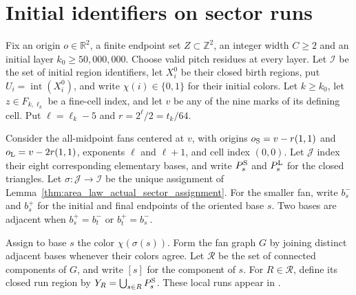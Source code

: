 \section{Initial identifiers on sector runs}
\label{sec:area_law_actual_sector_runs}

Fix an origin $o\in\mathbb R^2$, a finite endpoint set
$Z\subset\mathbb Z^2$, an integer width $C\ge2$ and an initial layer
$k_0\ge50{,}000{,}000$. Choose valid pitch residues at every
layer. Let $\mathcal I$ be the set of initial region identifiers, let $X_i^0$
be their closed birth regions, put $U_i=\operatorname{int}(X_i^0)$,
and write $\chi(i)\in\{0,1\}$ for their initial colors.
Let $k\ge k_0$, let $z\in F_{k,\ell_k}$ be a fine-cell index,
and let $v$ be any of the nine marks of its defining cell.
Put $\ell=\ell_k-5$ and $r=2^\ell/2=t_k/64$.

Consider the all-midpoint fans centered at $v$, with origins
$o_{\rm S}=v-r(1,1)$ and $o_{\rm L}=v-2r(1,1)$, exponents $\ell$
and $\ell+1$, and cell index $(0,0)$. Let $\mathcal J$ index their
eight corresponding elementary bases, and write $P_s^{\rm S}$ and
$P_s^{\rm L}$ for the closed triangles. Let
$\sigma:\mathcal J\to\mathcal I$ be the unique assignment of
Lemma~\ref{thm:area_law_actual_sector_assignment}.
For the smaller fan, write $b_s^-$ and $b_s^+$ for the initial and
final endpoints of the oriented base $s$. Two bases are adjacent when
$b_s^+=b_t^-$ or $b_t^+=b_s^-$.

Assign to base $s$ the color $\chi(\sigma(s))$. Form the fan graph
$G$ by joining distinct adjacent bases whenever their colors agree.
Let $\mathcal R$ be the set of connected components of $G$, and write $[s]$
for the component of $s$. For $R\in\mathcal R$, define its closed run region by
$Y_R=\bigcup_{s\in R}P_s^{\rm S}$.
These local runs appear in \cite[Section~11]{OpenAI2026AreaLaw}.


